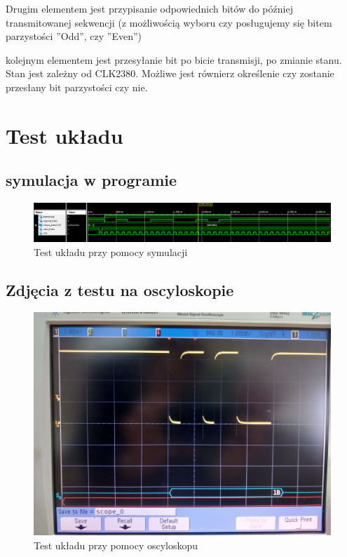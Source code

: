 Drugim elementem jest przypisanie odpowiednich bitów do później transmitowanej sekwencji (z możliwością wyboru czy posługujemy się bitem parzystości ''Odd'', czy ''Even'')


kolejnym elementem jest przesyłanie bit po bicie transmisji, po zmianie stanu. Stan jest zależny od CLK2380. Możliwe jest równierz określenie czy zostanie przesłany bit parzystości czy nie.


\section{Test układu}
\subsection{symulacja w programie}

\begin{figure}[!htb]
    \centering
    \includegraphics[width=18cm]{./Images/Symulacja.png}
    \caption*{Test układu przy pomocy symulacji}
\end{figure}
\clearpage

\subsection{Zdjęcia z testu na oscyloskopie}
\begin{figure}[!htb]
    \centering
    \includegraphics[width=18cm]{./Images/oscy.jpg}
    \caption*{Test układu przy pomocy oscyloskopu}
\end{figure}